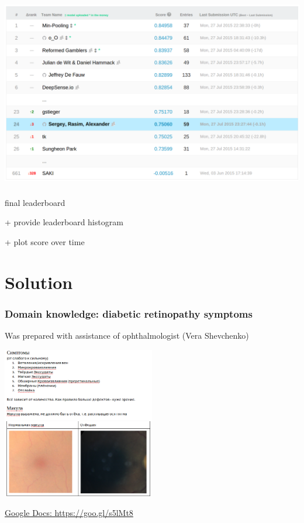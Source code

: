 \documentclass{beamer}
\begin{document}
\begin{frame}\frametitle{} 
\begin{center}
\includegraphics[width=\textwidth]{pics/LB_private.png}
\end{center}
\end{frame}

\begin{frame}\frametitle{} 
\par final leaderboard
\par + provide leaderboard histogram
\par + plot score over time
\end{frame}




\section{Solution}

\begin{frame}\frametitle{Domain knowledge: diabetic retinopathy symptoms}

\small Was prepared with assistance of ophthalmologist (Vera Shevchenko)

\begin{center}
\par \includegraphics[interpolate=true,valign=c,width=0.5\textwidth]{pics/symptoms_pic.png}
\vspace{5pt}
\par \hyperlink{https://goo.gl/s5lMt8}{Google Docs: https://goo.gl/s5lMt8}
\end{center}

\end{frame}
\end{document}
